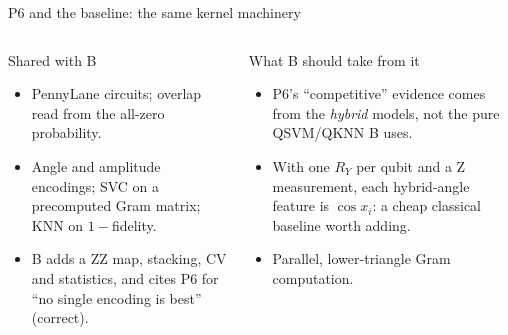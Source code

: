 \documentclass[aspectratio=169,10pt,t,xcolor={table}]{beamer}
\begin{document}
\begin{frame}{P6 and the baseline: the same kernel machinery}
\begin{columns}[T]
\begin{block}{Shared with B}
\footnotesize
\begin{itemize}
  \item PennyLane circuits; overlap read from the all-zero probability.
  \item Angle and amplitude encodings; SVC on a precomputed Gram matrix; KNN on $1-$fidelity.
  \item B adds a ZZ map, stacking, CV and statistics, and cites P6 for ``no single encoding is best'' (correct).
\end{itemize}
\end{block}
\begin{exampleblock}{What B should take from it}
\footnotesize
\begin{itemize}
  \item P6's ``competitive'' evidence comes from the \emph{hybrid} models, not the pure QSVM/QKNN B uses.
  \item With one $R_Y$ per qubit and a Z measurement, each hybrid-angle feature is $\cos x_i$: a cheap classical baseline worth adding.
  \item Parallel, lower-triangle Gram computation.
\end{itemize}
\end{exampleblock}
\end{columns}
\end{frame}
\end{document}

